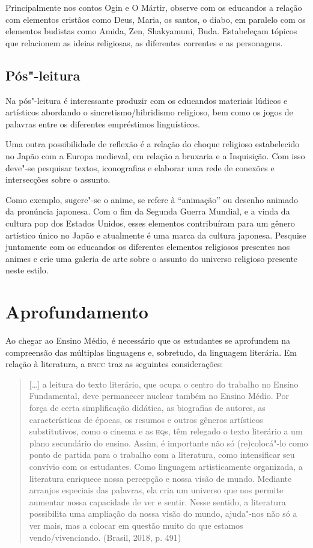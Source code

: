 \documentclass[12pt]{extarticle}
\begin{document}
Principalmente nos contos Ogin e O Mártir, observe com os educandos a
relação com elementos cristãos como Deus, Maria, os santos, o diabo, em
paralelo com os elementos budistas como Amida, Zen, Shakyamuni, Buda.
Estabeleçam tópicos que relacionem as ideias religiosas, as diferentes
correntes e as personagens.


\subsection{Pós"-leitura}

Na pós"-leitura é interessante produzir com os educandos
materiais lúdicos e artísticos abordando o sincretismo/hibridismo
religioso, bem como os jogos de palavras entre os diferentes empréstimos
linguísticos.

Uma outra possibilidade de reflexão é a relação do choque religioso
estabelecido no Japão com a Europa medieval, em relação a bruxaria e a
Inquisição. Com isso deve"-se pesquisar textos, iconografias e elaborar
uma rede de conexões e intersecções sobre o assunto.

Como exemplo, sugere"-se o anime, se refere à ``animação'' ou desenho
animado da pronúncia japonesa. Com o fim da Segunda Guerra Mundial, e a
vinda da cultura pop dos Estados Unidos, esses elementos contribuíram
para um gênero artístico único no Japão e atualmente é uma marca da
cultura japonesa. Pesquise juntamente com os educandos os diferentes
elementos religiosos presentes nos animes e crie uma galeria de arte
sobre o assunto do universo religioso presente neste estilo.


\section{Aprofundamento}

Ao chegar ao Ensino Médio, é necessário que os estudantes se aprofundem
na compreensão das múltiplas linguagens e, sobretudo, da linguagem
literária. Em relação à literatura, a \textsc{bncc} traz as seguintes
considerações:

\begin{quote}
{[}\ldots{}{]} a leitura do texto literário, que ocupa o centro do trabalho
no Ensino Fundamental, deve permanecer nuclear também no Ensino Médio.
Por força de certa simplificação didática, as biografias de autores, as
características de épocas, os resumos e outros gêneros artísticos
substitutivos, como o cinema e as \textsc{hq}s, têm relegado o texto literário a
um plano secundário do ensino. Assim, é importante não só (re)colocá"-lo
como ponto de partida para o trabalho com a literatura, como
intensificar seu convívio com os estudantes. Como linguagem
artisticamente organizada, a literatura enriquece nossa percepção e
nossa visão de mundo. Mediante arranjos especiais das palavras, ela cria
um universo que nos permite aumentar nossa capacidade de ver e sentir.
Nesse sentido, a literatura possibilita uma ampliação da nossa visão do
mundo, ajuda"-nos não só a ver mais, mas a colocar em questão muito do
que estamos vendo/vivenciando. (Brasil, 2018, p. 491)
\end{quote}
\end{document}
